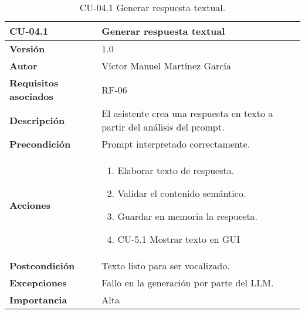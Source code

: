 \begin{table}[p]
    \centering
    \begin{tabularx}{\linewidth}{ p{} p{} }
        \toprule
        \textbf{CU-04.1}    & \textbf{Generar respuesta textual}\\
        \toprule
        \textbf{Versión}              & 1.0 \\
        \textbf{Autor}                & Víctor Manuel Martínez García \\
        \textbf{Requisitos asociados} & RF-06 \\
        \textbf{Descripción}          & El asistente crea una respuesta en texto a partir del análisis del prompt.\\
        \textbf{Precondición}         & Prompt interpretado correctamente.\\
        \textbf{Acciones}             &
        \begin{enumerate}
          \item Elaborar texto de respuesta.
          \item Validar el contenido semántico.
          \item Guardar en memoria la respuesta.
          \item CU-5.1 Mostrar texto en GUI
        \end{enumerate}\\
        \textbf{Postcondición}        & Texto listo para ser vocalizado.\\
        \textbf{Excepciones}          & Fallo en la generación por parte del LLM.\\
        \textbf{Importancia}          & Alta \\
        \bottomrule
    \end{tabularx}
    \caption{CU-04.1 Generar respuesta textual.}
    \label{CU-04.1 Generar respuesta textual}
\end{table}


